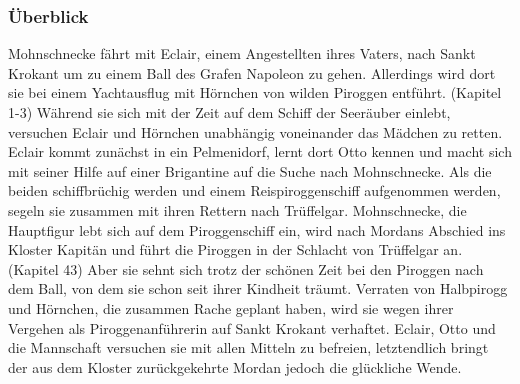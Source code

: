 \subsubsection{Überblick}
Mohnschnecke fährt mit Eclair, einem Angestellten ihres Vaters, nach Sankt Krokant um zu einem Ball des Grafen Napoleon zu gehen. Allerdings wird dort sie bei einem Yachtausflug mit Hörnchen von wilden Piroggen entführt. (Kapitel 1-3) Während sie sich mit der Zeit auf dem Schiff der Seeräuber einlebt, versuchen Eclair und Hörnchen unabhängig voneinander das Mädchen zu retten.  Eclair kommt zunächst in ein Pelmenidorf, lernt dort Otto kennen und macht sich mit seiner Hilfe auf einer  Brigantine auf die Suche nach Mohnschnecke. Als die beiden schiffbrüchig werden und einem Reispiroggenschiff aufgenommen werden, segeln sie zusammen mit ihren Rettern nach Trüffelgar. Mohnschnecke, die Hauptfigur lebt sich auf dem Piroggenschiff ein, wird nach Mordans Abschied ins Kloster Kapitän und führt die Piroggen in der Schlacht von Trüffelgar an. (Kapitel 43) Aber sie sehnt sich trotz der schönen Zeit bei den Piroggen nach dem Ball, von dem sie schon seit ihrer Kindheit träumt. Verraten von Halbpirogg und Hörnchen, die zusammen Rache geplant haben, wird sie wegen ihrer Vergehen als Piroggenanführerin auf Sankt Krokant verhaftet. Eclair, Otto und die Mannschaft versuchen sie mit allen Mitteln zu befreien, letztendlich bringt der aus dem Kloster zurückgekehrte Mordan jedoch die glückliche Wende.


